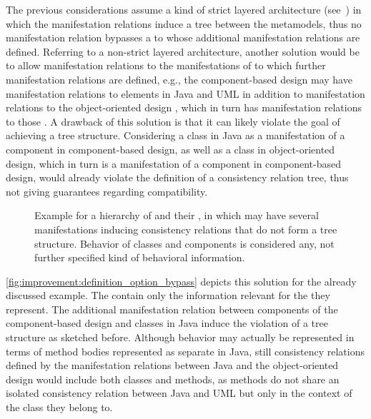 The previous considerations assume a kind of strict layered architecture (see~\cite{buschmann1996PatternsArchitecture-Book}) in which the manifestation relations induce a tree between the metamodels, thus no manifestation relation bypasses a \conceptmetamodel to whose \commonalities additional manifestation relations are defined.
Referring to a non-strict layered architecture, another solution would be to allow manifestation relations to the manifestations of \conceptmetamodels to which further manifestation relations are defined, e.g., the component-based design \commonalities may have manifestation relations to elements in Java and \gls{UML} in addition to manifestation relations to the object-oriented design \conceptmetamodels, which in turn has manifestation relations to those \concretemetamodels.
A drawback of this solution is that it can likely violate the goal of achieving a tree structure.
Considering a class in Java as a manifestation of a component in component-based design, as well as a class in object-oriented design, which in turn is a manifestation of a component in component-based design, would already violate the definition of a consistency relation tree, thus not giving guarantees regarding compatibility.

\begin{figure}
    \centering
    
    \caption[\Commonalities with multiple manifestation]{Example for a hierarchy of \conceptmetamodels and their \commonalities, in which \commonalities may have several manifestations inducing consistency relations that do not form a tree structure. Behavior of classes and components is considered any, not further specified kind of behavioral information.}
    \label{fig:improvement:definition_option_bypass}
\end{figure}

\autoref{fig:improvement:definition_option_bypass} depicts this solution for the already discussed example.
The \conceptmetamodels contain only the information relevant for the \commonalities they represent.
The additional manifestation relation between components of the component-based design \conceptmetamodel and classes in Java induce the violation of a tree structure as sketched before.
Although behavior may actually be represented in terms of method bodies represented as separate \metaclasses in Java, still consistency relations defined by the manifestation relations between Java and the object-oriented design \conceptmetamodel would include both classes and methods, as methods do not share an isolated consistency relation between Java and \gls{UML} but only in the context of the class they belong to.


